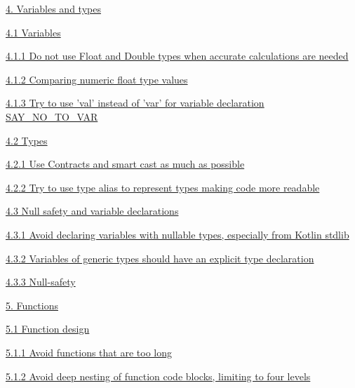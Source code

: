 {{{{{{{{{{{{{{{{\hspace{0.0cm}\hyperref[sec:4.]{4. Variables and types}

\hspace{0.5cm}\hyperref[sec:4.1]{ 4.1 Variables}

\hspace{1.0cm}\hyperref[sec:4.1.1]{ 4.1.1 Do not use Float and Double types when accurate calculations are needed}

\hspace{1.0cm}\hyperref[sec:4.1.2]{ 4.1.2 Comparing numeric float type values}

\hspace{1.0cm}\hyperref[sec:4.1.3]{ 4.1.3 Try to use 'val' instead of 'var' for variable declaration SAY\_NO\_TO\_VAR}

\hspace{0.5cm}\hyperref[sec:4.2]{ 4.2 Types}

\hspace{1.0cm}\hyperref[sec:4.2.1]{ 4.2.1 Use Contracts and smart cast as much as possible}

\hspace{1.0cm}\hyperref[sec:4.2.2]{ 4.2.2 Try to use type alias to represent types making code more readable}

\hspace{0.5cm}\hyperref[sec:4.3]{ 4.3 Null safety and variable declarations}

\hspace{1.0cm}\hyperref[sec:4.3.1]{ 4.3.1 Avoid declaring variables with nullable types, especially from Kotlin stdlib}

\hspace{1.0cm}\hyperref[sec:4.3.2]{ 4.3.2 Variables of generic types should have an explicit type declaration}

\hspace{1.0cm}\hyperref[sec:4.3.3]{ 4.3.3 Null-safety}

\hspace{0.0cm}\hyperref[sec:]{}

\hspace{0.0cm}\hyperref[sec:5.]{5. Functions}

\hspace{0.5cm}\hyperref[sec:5.1]{ 5.1 Function design}

\hspace{1.0cm}\hyperref[sec:5.1.1]{ 5.1.1 Avoid functions that are too long }

\hspace{1.0cm}\hyperref[sec:5.1.2]{ 5.1.2 Avoid deep nesting of function code blocks, limiting to four levels}

}}}}}}}}}}}}}}}}
